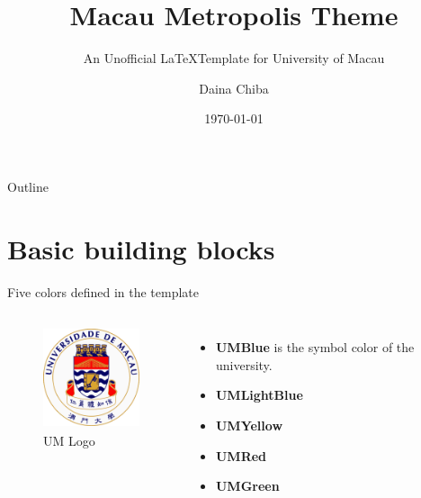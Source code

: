\documentclass[12pt]{beamer}
\title{Macau Metropolis Theme}
\subtitle{An Unofficial \LaTeX \space Template for University of Macau}
\date{\today}
\author{Daina Chiba}
\institute{University of Macau}
\begin{document}
\maketitle %
\begin{frame}[plain]{Outline} %
	\tableofcontents
\end{frame}



\section{Basic building blocks}


\begin{frame}{{\color{UMYellow} Five colors} defined in the template}
\begin{columns}
    	\begin{figure}
        \centering
        \includegraphics[height=3cm]{figures/UMlogo.png}
        \caption{UM Logo}
        \end{figure}
        \begin{itemize}
        \item {\color{UMBlue}\bf UMBlue} is the symbol color of the university.
        \item {\color{UMLightBlue}\bf UMLightBlue}
        \item {\color{UMYellow}\bf UMYellow}
		\item {\color{UMRed}\bf UMRed}
		\item {\color{UMGreen}\bf UMGreen}
        \end{itemize}
	\end{columns} 
\end{frame}
\end{document}
